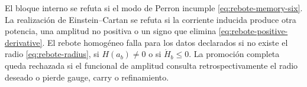 \begin{falsifierbox}
El bloque interno se refuta si el modo de Perron incumple
\cref{eq:rebote-memory-six}.  La realizaci\'on de Einstein--Cartan se refuta
si la corriente inducida produce otra potencia, una amplitud no positiva o
un signo que elimina \cref{eq:rebote-positive-derivative}.  El rebote
homog\'eneo falla para los datos declarados si no existe el radio
\cref{eq:rebote-radius}, si \(H(a_b)\ne0\) o si \(\dot H_b\le0\).  La
promoci\'on completa queda rechazada si el funcional de amplitud consulta
retrospectivamente el radio deseado o pierde gauge, carry o refinamiento.
\end{falsifierbox}
